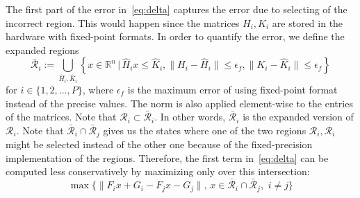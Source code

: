 The first part of the error in~\autoref{eq:delta} captures the error due to
selecting of the incorrect region.
This would happen since the matrices $H_i,K_i$ are stored in the hardware with fixed-point formats. In order to quantify the error, we define the expanded regions
\begin{equation*}
\bar{\mathcal R}_i := \bigcup_{\hat H_i,\hat K_i} \left\{x\in\mathbb R^n\,|\,\hat H_i x\le \hat K_i, \|H_i-\hat H_i\|\le \epsilon_f,\|K_i-\hat K_i\|\le \epsilon_f\right\}
\end{equation*}
for $i\in\{1,2,\ldots, P\}$, where $\epsilon_f$ is the maximum error of using fixed-point format instead of the precise values. The norm is also applied element-wise to the entries of the matrices. Note that $\mathcal R_i\subset \bar{\mathcal R}_i$. In other words, $\bar{\mathcal R}_i$ is the expanded version of $\mathcal R_i$.
Note that $\bar{\mathcal R}_i\cap \bar{\mathcal R}_j$ gives us the states where one of the two regions $\mathcal R_i, \mathcal R_i$ might be selected instead of the other one because of the fixed-precision implementation of the regions.   
 Therefore, the first term in~\autoref{eq:delta} can be computed less conservatively by maximizing only over this intersection:
 \begin{equation}
 \label{eq:maximization}
 \max\{\|F_ix+G_i-F_jx-G_j\|,\,x\in \bar{\mathcal R}_{i}\cap\bar{\mathcal R}_{j},\,\, i\neq j\}
 \end{equation} 
 


